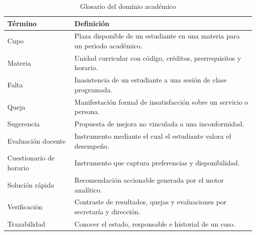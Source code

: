 \begin{table}[H]
\centering
\caption{Glosario del dominio académico}
\label{tab:glosario}
\begin{tabularx}{\textwidth}{@{}l X@{}}
\toprule
\rowcolor{verdeClaro}
\textbf{Término} & \textbf{Definición} \\
\midrule
Cupo & Plaza disponible de un estudiante en una materia para un periodo académico. \\
Materia & Unidad curricular con código, créditos, prerrequisitos y horario. \\
Falta & Inasistencia de un estudiante a una sesión de clase programada. \\
Queja & Manifestación formal de insatisfacción sobre un servicio o persona. \\
Sugerencia & Propuesta de mejora no vinculada a una inconformidad. \\
Evaluación docente & Instrumento mediante el cual el estudiante valora el desempeño. \\
Cuestionario de horario & Instrumento que captura preferencias y disponibilidad. \\
Solución rápida & Recomendación accionable generada por el motor analítico. \\
Verificación & Contraste de resultados, quejas y evaluaciones por secretaría y dirección. \\
Trazabilidad & Conocer el estado, responsable e historial de un caso. \\
\bottomrule
\end{tabularx}
\end{table}